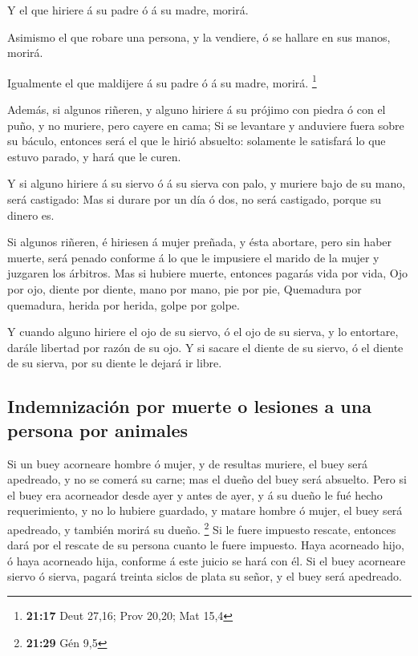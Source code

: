  Y el que hiriere á su padre ó á su madre, morirá.

 Asimismo el que robare una persona, y la vendiere, ó se
hallare en sus manos, morirá.

 Igualmente el que maldijere á su padre ó á su madre,
morirá. \footnote{\textbf{21:17} Deut 27,16; Prov 20,20; Mat 15,4}

 Además, si algunos riñeren, y alguno hiriere á su
prójimo con piedra ó con el puño, y no muriere, pero cayere en cama;
 Si se levantare y anduviere fuera sobre su báculo,
entonces será el que le hirió absuelto: solamente le satisfará lo que
estuvo parado, y hará que le curen.

 Y si alguno hiriere á su siervo ó á su sierva con palo,
y muriere bajo de su mano, será castigado:  Mas si durare
por un día ó dos, no será castigado, porque su dinero es.

 Si algunos riñeren, é hiriesen á mujer preñada, y ésta
abortare, pero sin haber muerte, será penado conforme á lo que le
impusiere el marido de la mujer y juzgaren los árbitros. 
Mas si hubiere muerte, entonces pagarás vida por vida, 
Ojo por ojo, diente por diente, mano por mano, pie por pie,
 Quemadura por quemadura, herida por herida, golpe por
golpe.

 Y cuando alguno hiriere el ojo de su siervo, ó el ojo de
su sierva, y lo entortare, darále libertad por razón de su ojo.
 Y si sacare el diente de su siervo, ó el diente de su
sierva, por su diente le dejará ir libre.

\hypertarget{indemnizaciuxf3n-por-muerte-o-lesiones-a-una-persona-por-animales}{%
\subsection{Indemnización por muerte o lesiones a una persona por
animales}\label{indemnizaciuxf3n-por-muerte-o-lesiones-a-una-persona-por-animales}}

 Si un buey acorneare hombre ó mujer, y de resultas
muriere, el buey será apedreado, y no se comerá su carne; mas el dueño
del buey será absuelto.  Pero si el buey era acorneador
desde ayer y antes de ayer, y á su dueño le fué hecho requerimiento, y
no lo hubiere guardado, y matare hombre ó mujer, el buey será apedreado,
y también morirá su dueño. \footnote{\textbf{21:29} Gén 9,5}
 Si le fuere impuesto rescate, entonces dará por el
rescate de su persona cuanto le fuere impuesto.  Haya
acorneado hijo, ó haya acorneado hija, conforme á este juicio se hará
con él.  Si el buey acorneare siervo ó sierva, pagará
treinta siclos de plata su señor, y el buey será apedreado.

